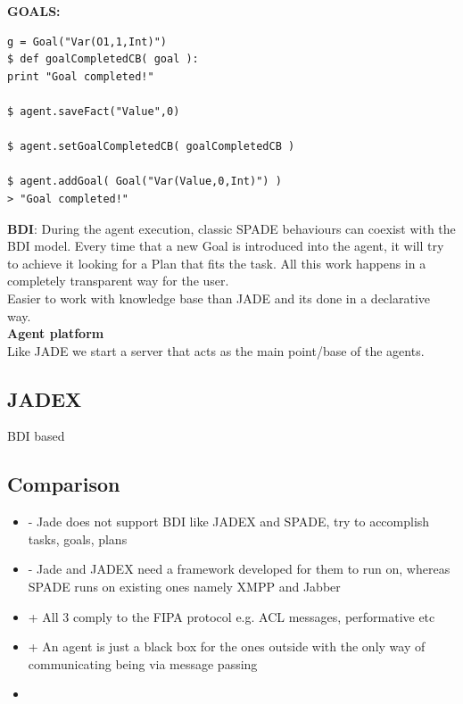 \documentclass[a4paper, 11pt]{article}
\begin{document}
\textbf{GOALS:} \\
\begin{verbatim}
g = Goal("Var(O1,1,Int)")
$ def goalCompletedCB( goal ):
print "Goal completed!"

$ agent.saveFact("Value",0)

$ agent.setGoalCompletedCB( goalCompletedCB )

$ agent.addGoal( Goal("Var(Value,0,Int)") )
> "Goal completed!"
\end{verbatim}

\textbf{BDI}: During the agent execution, classic SPADE behaviours can coexist with the BDI model. Every time that a new Goal is introduced into the agent, it will try to achieve it looking for a Plan that fits the task. All this work happens in a completely transparent way for the user. \\
Easier to work with knowledge base than JADE and its done in a declarative way. \\

\textbf{Agent platform} \\
Like JADE we start a server that acts as the main point/base of the agents.

\subsection{JADEX}

BDI based \\


\subsection{Comparison}

\begin{itemize}
	\item - Jade does not support BDI like JADEX and SPADE, try to accomplish tasks, goals, plans
	\item - Jade and JADEX need a framework developed for them to run on, whereas SPADE runs on existing ones namely XMPP and Jabber
	\item + All 3 comply to the FIPA protocol e.g. ACL messages, performative etc
	\item + An agent is just a black box for the ones outside with the only way of communicating being via message passing
	\item 
\end{itemize}

\end{document}
